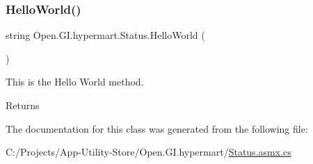 \subsubsection{\texorpdfstring{Hello\+World()}{HelloWorld()}}
{\footnotesize\ttfamily string Open.\+G\+I.\+hypermart.\+Status.\+Hello\+World (\begin{DoxyParamCaption}{ }\end{DoxyParamCaption})}



This is the Hello World method. 

\begin{DoxyReturn}{Returns}

\end{DoxyReturn}


The documentation for this class was generated from the following file\+:\begin{DoxyCompactItemize}
\item 
C\+:/\+Projects/\+App-\/\+Utility-\/\+Store/\+Open.\+G\+I.\+hypermart/\hyperlink{_status_8asmx_8cs}{Status.\+asmx.\+cs}\end{DoxyCompactItemize}

